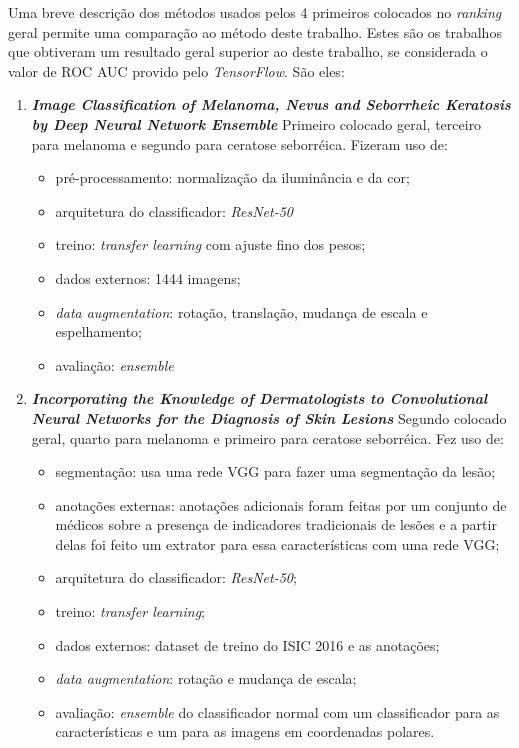 Uma breve descrição dos métodos usados pelos 4 primeiros colocados no \textit{ranking} geral permite uma comparação ao método deste trabalho. Estes são os trabalhos que obtiveram um resultado geral superior ao deste trabalho, se considerada o valor de ROC AUC provido pelo \textit{TensorFlow}. São eles:
\begin{enumerate}
\item \textbf{\textit{Image Classification of Melanoma, Nevus and Seborrheic Keratosis 
by Deep Neural Network Ensemble}} \cite{Matsunaga2017} Primeiro colocado geral, terceiro para melanoma e segundo para ceratose seborréica. Fizeram uso de:
\begin{itemize}
\item pré-processamento: normalização da iluminância e da cor;
\item arquitetura do classificador: \textit{ResNet-50}
\item treino: \textit{transfer learning} com ajuste fino dos pesos;
\item dados externos: 1444 imagens;
\item \textit{data augmentation}: rotação, translação, mudança de escala e espelhamento;
\item avaliação: \textit{ensemble}
\end{itemize}

\item \textbf{\textit{ Incorporating the Knowledge of Dermatologists to Convolutional Neural Networks for the Diagnosis of Skin Lesions}} \cite{Gonzalez2017} Segundo colocado geral, quarto para melanoma e primeiro para ceratose seborréica. Fez uso de:
\begin{itemize}
\item segmentação: usa uma rede VGG para fazer uma segmentação da lesão;
\item anotações externas: anotações adicionais foram feitas por um conjunto de médicos sobre a presença de indicadores tradicionais de lesões e a partir delas foi feito um extrator para essa características com uma rede VGG;
\item arquitetura do classificador: \textit{ResNet-50};
\item treino: \textit{transfer learning};
\item dados externos: dataset de treino do ISIC 2016 e as anotações;
\item \textit{data augmentation}: rotação e mudança de escala;
\item avaliação: \textit{ensemble} do classificador normal com um classificador para as características e um para as imagens em coordenadas polares.
\end{itemize}
\end{enumerate}

